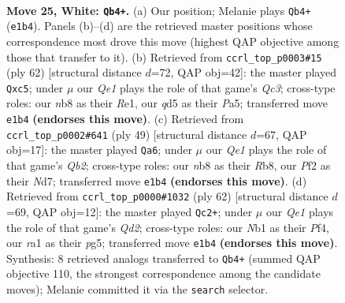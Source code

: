 \documentclass[11pt]{article}
\begin{document}
\clearpage

\begin{figure}[p]\centering
\begin{subfigure}{0.46\textwidth}\centering
\resizebox{\linewidth}{!}{%
\newchessgame
\chessboard[
  setfen={1n3k2/5p2/5np1/3q3p/3p3P/3P2PN/5P2/rN2QRK1 w - - 0 25},
  showmover=false,
  pgfstyle=straightmove, color=movearrow, markmove={e1-b4}
]}
\caption{}
\end{subfigure}\hfill
\begin{subfigure}{0.46\textwidth}\centering
\resizebox{\linewidth}{!}{%
\newchessgame
\chessboard[
  setfen={6k1/p3q2p/3n2p1/P1pP1p2/4r3/1PQ1N1P1/6KP/4R3 w - - 6 32},
  showmover=false,
  pgfstyle=straightmove, color=movearrow, markmove={c3-c5}
]}
\caption{}
\end{subfigure}
\\[4pt]
\begin{subfigure}{0.46\textwidth}\centering
\resizebox{\linewidth}{!}{%
\newchessgame
\chessboard[
  setfen={1r4k1/1q1n1ppp/4p3/6P1/1p1P4/1Q2PN2/5PP1/2R3K1 b - - 1 25},
  showmover=false,
  pgfstyle=straightmove, color=movearrow, markmove={b7-a6}
]}
\caption{}
\end{subfigure}\hfill
\begin{subfigure}{0.46\textwidth}\centering
\resizebox{\linewidth}{!}{%
\newchessgame
\chessboard[
  setfen={4n3/2p2r1k/5q1p/2pP2p1/5P2/7P/3QN1P1/5RK1 w - - 0 32},
  showmover=false,
  pgfstyle=straightmove, color=movearrow, markmove={d2-c2}
]}
\caption{}
\end{subfigure}
\caption{\textbf{Move 25, White: \texttt{Qb4+}.} (a) Our position; Melanie plays \texttt{Qb4+} (\texttt{e1b4}). Panels (b)--(d) are the retrieved master positions whose correspondence most drove this move (highest QAP objective among those that transfer to it). (b) Retrieved from \texttt{ccrl\_top\_p0003\#15} (ply 62) [structural distance $d$=72, QAP obj=42]: the master played \texttt{Qxc5}; under $\mu$ our \emph{Qe1} plays the role of that game's \emph{Qc3}; cross-type roles: our \emph{n}b8 as their \emph{R}e1, our \emph{q}d5 as their \emph{P}a5; transferred move \texttt{e1b4} \textbf{(endorses this move)}. (c) Retrieved from \texttt{ccrl\_top\_p0002\#641} (ply 49) [structural distance $d$=67, QAP obj=17]: the master played \texttt{Qa6}; under $\mu$ our \emph{Qe1} plays the role of that game's \emph{Qb2}; cross-type roles: our \emph{n}b8 as their \emph{R}b8, our \emph{P}f2 as their \emph{N}d7; transferred move \texttt{e1b4} \textbf{(endorses this move)}. (d) Retrieved from \texttt{ccrl\_top\_p0000\#1032} (ply 62) [structural distance $d$=69, QAP obj=12]: the master played \texttt{Qc2+}; under $\mu$ our \emph{Qe1} plays the role of that game's \emph{Qd2}; cross-type roles: our \emph{N}b1 as their \emph{P}f4, our \emph{r}a1 as their \emph{p}g5; transferred move \texttt{e1b4} \textbf{(endorses this move)}. Synthesis: 8 retrieved analogs transferred to \texttt{Qb4+} (summed QAP objective 110, the strongest correspondence among the candidate moves); Melanie committed it via the \texttt{search} selector.}
\label{fig:thought-m48}
\end{figure}
\end{document}
